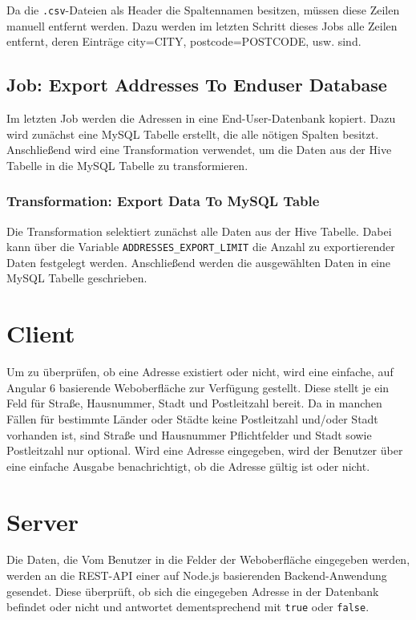 \documentclass[
	a4paper,
	12p,
	bibliography=totocnumbered
]{scrartcl}
\begin{document}
Da die \texttt{.csv}-Dateien als Header die Spaltennamen besitzen, müssen diese Zeilen manuell entfernt werden. Dazu werden im letzten Schritt dieses Jobs alle Zeilen entfernt, deren Einträge city=\glqq CITY\grqq{}, postcode=\glqq POSTCODE\grqq{}, usw. sind.

	
\subsection{Job: Export Addresses To Enduser Database}

Im letzten Job werden die Adressen in eine End-User-Datenbank kopiert. Dazu wird zunächst eine MySQL Tabelle erstellt, die alle nötigen Spalten besitzt. Anschließend wird eine Transformation verwendet, um die Daten aus der Hive Tabelle in die MySQL Tabelle zu transformieren.


\subsubsection{Transformation: Export Data To MySQL Table}

Die Transformation selektiert zunächst alle Daten aus der Hive Tabelle. Dabei kann über die Variable \texttt{ADDRESSES\_EXPORT\_LIMIT} die Anzahl zu exportierender Daten festgelegt werden. Anschließend werden die ausgewählten Daten in eine MySQL Tabelle geschrieben.


\section{Client}

Um zu überprüfen, ob eine Adresse existiert oder nicht, wird eine einfache, auf Angular 6 basierende Weboberfläche zur Verfügung gestellt. Diese stellt je ein Feld für Straße, Hausnummer, Stadt und Postleitzahl  bereit. Da in manchen Fällen für bestimmte Länder oder Städte keine Postleitzahl und/oder Stadt vorhanden ist, sind Straße und Hausnummer Pflichtfelder und Stadt sowie Postleitzahl nur optional. Wird eine Adresse eingegeben, wird der Benutzer über eine einfache Ausgabe benachrichtigt, ob die Adresse gültig ist oder nicht.

\section{Server}

Die Daten, die Vom Benutzer in die Felder der Weboberfläche eingegeben werden, werden an die REST-API einer auf Node.js basierenden Backend-Anwendung gesendet. Diese überprüft, ob sich die eingegeben Adresse in der Datenbank befindet oder nicht und antwortet dementsprechend mit \texttt{true} oder \texttt{false}.
\end{document}
